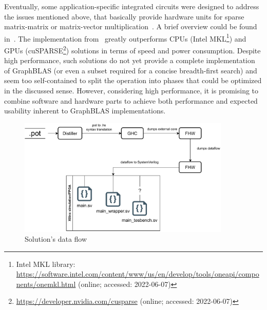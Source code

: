 
Eventually, some application-specific integrated circuits were designed to address the issues mentioned above, that basically provide hardware units for sparse matrix-matrix or matrix-vector multiplication~\cite{Song_2016, CPU-FPGA, zhang2020sparch,Systolic}. 
A brief overview could be found in~\cite{zhang2020sparch}. The implementation from~\cite{zhang2020sparch} greatly outperforms CPUs (Intel MKL\footnote{Intel MKL library: \url{https://software.intel.com/content/www/us/en/develop/tools/oneapi/components/onemkl.html}  (online; accessed:
2022-06-07)}) and GPUs (cuSPARSE\footnote{\url{https://developer.nvidia.com/cusparse} (online; accessed:
2022-06-07)}) solutions in terms of speed and power consumption. Despite high performance, such solutions do not yet provide a complete implementation of GraphBLAS (or even a subset required for a concise breadth-first search) and seem too self-contained to split the operation into phases that could be optimized in the discussed sense. However, considering high performance, it is promising to combine software and hardware parts to achieve both performance and expected usability inherent to GraphBLAS implementations.


\begin{figure}[t]
    \centering
    \includegraphics[width=0.9\textwidth]{figures/arch.drawio (4).pdf}
    \caption{Solution's data flow}
    \label{fig:archI}
\end{figure}

